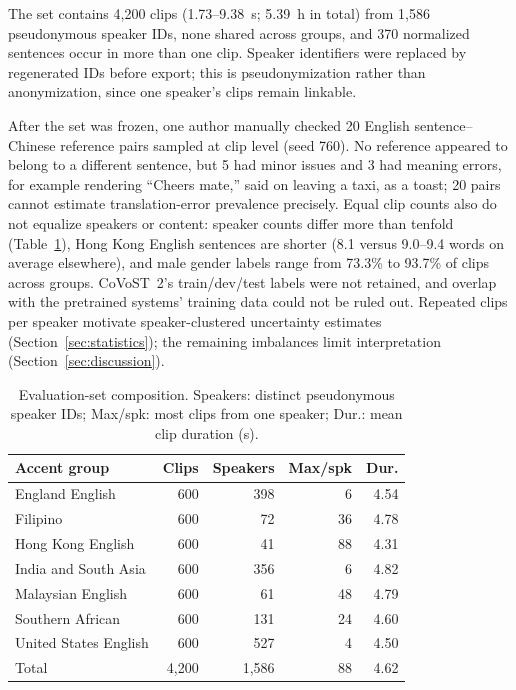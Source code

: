 The set contains 4,200 clips (1.73--9.38~s; 5.39~h in total) from 1,586
pseudonymous speaker IDs, none shared across groups, and 370 normalized
sentences occur in more than one clip. Speaker identifiers were replaced by
regenerated IDs before export; this is pseudonymization rather than
anonymization, since one speaker's clips remain linkable.

After the set was frozen, one author manually checked 20 English
sentence--Chinese reference pairs sampled at clip level (seed 760). No
reference appeared to belong to a different sentence, but 5 had minor issues
and 3 had meaning errors, for example rendering ``Cheers mate,'' said on
leaving a taxi, as a toast; 20 pairs cannot estimate translation-error
prevalence precisely. Equal clip counts also do not equalize speakers or
content: speaker counts differ more than tenfold (Table~\ref{tab:dataset}),
Hong Kong English sentences are shorter (8.1 versus 9.0--9.4 words on average
elsewhere), and male gender labels range from 73.3\% to 93.7\% of clips across
groups. CoVoST~2's train/dev/test labels were not retained, and overlap with
the pretrained systems' training data could not be ruled out. Repeated clips
per speaker motivate speaker-clustered uncertainty estimates
(Section~\ref{sec:statistics}); the remaining imbalances limit interpretation
(Section~\ref{sec:discussion}).

\begin{table}[t]
\caption{Evaluation-set composition. Speakers: distinct pseudonymous speaker
IDs; Max/spk: most clips from one speaker; Dur.: mean clip duration (s).}
\label{tab:dataset}
\centering
\small
\begin{tabularx}{\columnwidth}{@{}Xrrrr@{}}
\toprule
Accent group & Clips & Speakers & Max/spk & Dur. \\
\midrule
England English & 600 & 398 & 6 & 4.54 \\
Filipino & 600 & 72 & 36 & 4.78 \\
Hong Kong English & 600 & 41 & 88 & 4.31 \\
India and South Asia & 600 & 356 & 6 & 4.82 \\
Malaysian English & 600 & 61 & 48 & 4.79 \\
Southern African & 600 & 131 & 24 & 4.60 \\
United States English & 600 & 527 & 4 & 4.50 \\
\midrule
Total & 4,200 & 1,586 & 88 & 4.62 \\
\bottomrule
\end{tabularx}
\end{table}
